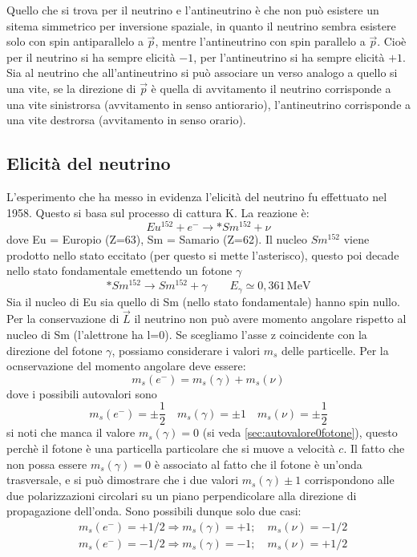 Quello che si trova per il neutrino e l'antineutrino è che non può esistere 
un sitema simmetrico per inversione spaziale, in quanto il neutrino sembra
esistere solo con spin antiparallelo a $\vec{p}$, mentre l'antineutrino con 
spin parallelo a $\vec{p}$. Cioè per il neutrino si ha sempre elicità $-1$,
per l'antineutrino si ha sempre elicità $+1$. Sia al neutrino che 
all'antineutrino si può associare un verso analogo a quello si una vite, se la 
direzione di $\vec{p}$
è quella di avvitamento il neutrino corrisponde a una vite sinistrorsa 
(avvitamento in senso antiorario), l'antineutrino corrisponde a una vite 
destrorsa
(avvitamento in senso orario).
\subsection{Elicità del neutrino}
L'esperimento che ha messo in evidenza l'elicità del 
neutrino fu effettuato nel 1958. Questo si basa sul processo di cattura K. La 
reazione è:
\[
Eu^{152}+e^-\rightarrow *Sm^{152}+\nu
\]
dove Eu = Europio (Z=63), Sm = Samario (Z=62).
Il nucleo $Sm^{152}$ viene prodotto nello stato eccitato (per questo si mette 
l'asterisco), questo poi decade nello stato fondamentale emettendo un fotone 
$\gamma$
\[
*Sm^{152}\rightarrow Sm^{152}+\gamma\qquad 
E_{\gamma}\simeq0,361\,\si{\mega\electronvolt}
\]
Sia il nucleo di Eu sia quello di Sm (nello stato fondamentale) hanno spin 
nullo. Per la conservazione di $\vec{L}$ il neutrino non può avere momento 
angolare rispetto
al nucleo di Sm (l'alettrone ha l=0). Se scegliamo l'asse z coincidente con la 
direzione del fotone $\gamma$, possiamo considerare i valori $m_s$ delle 
particelle.
Per la ocnservazione del momento angolare deve essere:
\[
m_s(e^-)=m_s(\gamma)+m_s(\nu)
\]
dove i possibili autovalori sono
\[
m_s(e^-)=\pm\frac{1}{2}\quad m_s(\gamma)=\pm1\quad m_s(\nu)=\pm\frac{1}{2}
\]
si noti che manca il valore $m_s(\gamma)=0$ (si veda
\autoref{sec:autovalore0fotone}), questo perchè il fotone è una particella
particolare che si muove a velocità $c$.
Il fatto che non possa essere $m_s(\gamma)=0$ è associato al fatto che il 
fotone è un'onda trasversale, e si può dimostrare che i due valori 
$m_s(\gamma)\pm1$
corrispondono alle due polarizzazioni circolari su un piano perpendicolare alla 
direzione di propagazione dell'onda.
Sono possibili dunque solo due casi:
\begin{align*}
&m_s(e^-)=+1/2\Rightarrow m_s(\gamma)=+1;\quad m_s(\nu)=-1/2\\
&m_s(e^-)=-1/2\Rightarrow m_s(\gamma)=-1;\quad m_s(\nu)=+1/2
\end{align*}
